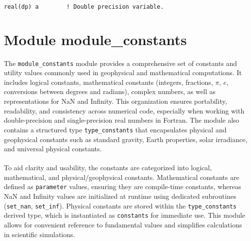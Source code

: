 \documentclass[12pt,a4paper]{report}
\begin{document}
\begin{lstlisting}
real(dp) a        ! Double precision variable.
\end{lstlisting}

\section{Module module\_constants}

\paragraph{} 
The \texttt{module\_constants} module provides a comprehensive set of constants and utility values commonly used in geophysical and mathematical computations. 
It includes logical constants, mathematical constants (integers, fractions, $\pi$, $e$, conversions between degrees and radians), complex numbers, as well as representations for NaN and Infinity. 
This organization ensures portability, readability, and consistency across numerical code, especially when working with double-precision and single-precision real numbers in Fortran. 
The module also contains a structured type \texttt{type\_constants} that encapsulates physical and geophysical constants such as standard gravity, Earth properties, solar irradiance, and universal physical constants.

\paragraph{} 
To aid clarity and usability, the constants are categorized into logical, mathematical, and physical/geophysical constants. 
Mathematical constants are defined as \texttt{parameter} values, ensuring they are compile-time constants, whereas NaN and Infinity values are initialized at runtime using dedicated subroutines (\texttt{set\_nan}, \texttt{set\_inf}). 
Physical constants are stored within the \texttt{type\_constants} derived type, which is instantiated as \texttt{constants} for immediate use. 
This module allows for convenient reference to fundamental values and simplifies calculations in scientific simulations.
\end{document}

